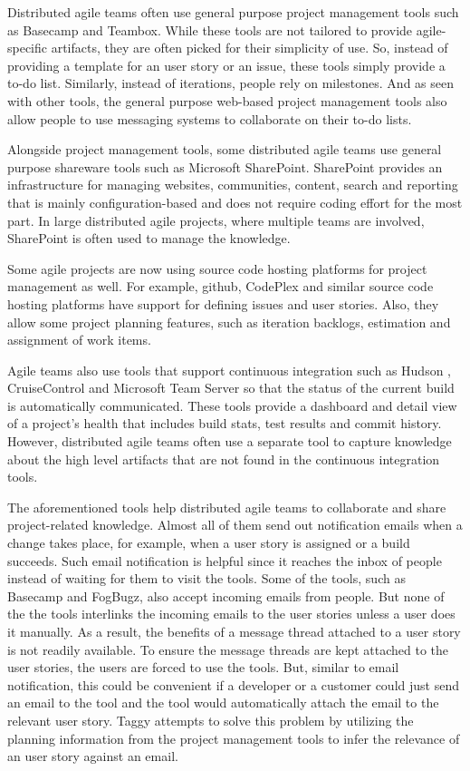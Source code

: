 Distributed agile teams often use general purpose project management tools such as Basecamp\cite{basecamp} and Teambox\cite{team_box}. While these tools are not tailored to provide agile-specific artifacts, they are often picked for their simplicity of use. So, instead of providing a template for an user story or an issue, these tools simply provide a to-do list. Similarly, instead of iterations, people rely on milestones. And as seen with other tools, the general purpose web-based project management tools also allow people to use messaging systems to collaborate on their to-do lists.

Alongside project management tools, some distributed agile teams use general purpose shareware tools such as Microsoft SharePoint\cite{share_point}. SharePoint provides an infrastructure for managing websites, communities, content, search and reporting that is mainly configuration-based and does not require coding effort for the most part. In large distributed agile projects, where multiple teams are involved, SharePoint is often used to manage the knowledge.

Some agile projects are now using source code hosting platforms for project management as well. For example, github\cite{github}, CodePlex\cite{codeplex} and similar source code hosting platforms have support for defining issues and user stories. Also, they allow some project planning features, such as iteration backlogs, estimation and assignment of work items.

Agile teams also use tools that support continuous integration such as Hudson \cite{Hudson}, CruiseControl\cite{cruise_control} and Microsoft Team Server\cite{team_server} so that the status of the current build is automatically communicated. These tools provide a dashboard and detail view of a project's health that includes build stats, test results and commit history. However, distributed agile teams often use a separate tool to capture knowledge about the high level artifacts that are not found in the continuous integration tools.

The aforementioned tools help distributed agile teams to collaborate and share project-related knowledge. Almost all of them send out notification emails when a change takes place, for example, when a user story is assigned or a build succeeds. Such email notification is helpful since it reaches the inbox of people instead of waiting for them to visit the tools. Some of the tools, such as Basecamp and FogBugz, also accept incoming emails from people. But none of the the tools interlinks the incoming emails to the user stories unless a user does it manually. As a result, the benefits of a message thread attached to a user story is not readily available. To ensure the message threads are kept attached to the user stories, the users are forced to use the tools. But, similar to email notification, this could be convenient if a developer or a customer could just send an email to the tool and the tool would automatically attach the email to the relevant user story. Taggy attempts to solve this problem by utilizing the planning information from the project management tools to infer the relevance of an user story against an email.

